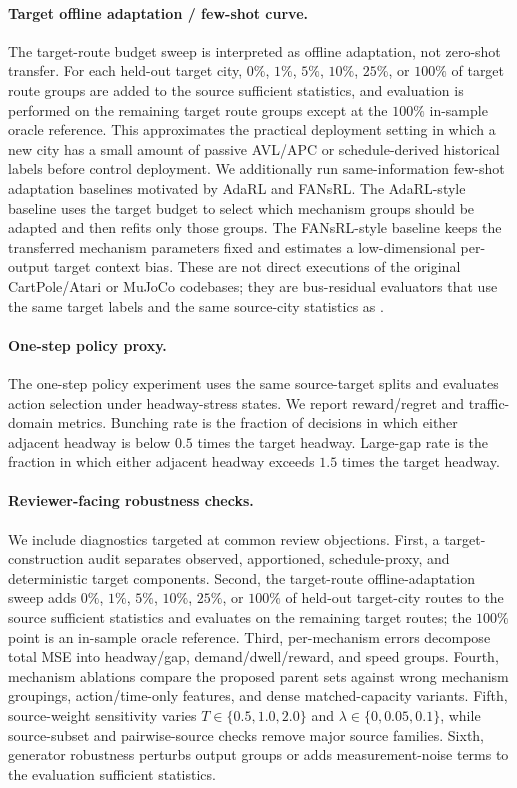 \paragraph{Target offline adaptation / few-shot curve.}
The target-route budget sweep is interpreted as offline adaptation, not zero-shot transfer.
For each held-out target city, $0\%$, $1\%$, $5\%$, $10\%$, $25\%$, or $100\%$ of target route groups are added to the source sufficient statistics, and evaluation is performed on the remaining target route groups except at the $100\%$ in-sample oracle reference.
This approximates the practical deployment setting in which a new city has a small amount of passive AVL/APC or schedule-derived historical labels before control deployment.
We additionally run same-information few-shot adaptation baselines motivated by AdaRL and FANsRL.
The AdaRL-style baseline uses the target budget to select which mechanism groups should be adapted and then refits only those groups.
The FANsRL-style baseline keeps the transferred mechanism parameters fixed and estimates a low-dimensional per-output target context bias.
These are not direct executions of the original CartPole/Atari or MuJoCo codebases; they are bus-residual evaluators that use the same target labels and the same source-city statistics as \ours.

\paragraph{One-step policy proxy.}
The one-step policy experiment uses the same source-target splits and evaluates action selection under headway-stress states.
We report reward/regret and traffic-domain metrics.
Bunching rate is the fraction of decisions in which either adjacent headway is below $0.5$ times the target headway.
Large-gap rate is the fraction in which either adjacent headway exceeds $1.5$ times the target headway.

\paragraph{Reviewer-facing robustness checks.}
We include diagnostics targeted at common review objections.
First, a target-construction audit separates observed, apportioned, schedule-proxy, and deterministic target components.
Second, the target-route offline-adaptation sweep adds $0\%$, $1\%$, $5\%$, $10\%$, $25\%$, or $100\%$ of held-out target-city routes to the source sufficient statistics and evaluates on the remaining target routes; the $100\%$ point is an in-sample oracle reference.
Third, per-mechanism errors decompose total MSE into headway/gap, demand/dwell/reward, and speed groups.
Fourth, mechanism ablations compare the proposed parent sets against wrong mechanism groupings, action/time-only features, and dense matched-capacity variants.
Fifth, source-weight sensitivity varies $T \in \{0.5,1.0,2.0\}$ and $\lambda \in \{0,0.05,0.1\}$, while source-subset and pairwise-source checks remove major source families.
Sixth, generator robustness perturbs output groups or adds measurement-noise terms to the evaluation sufficient statistics.

